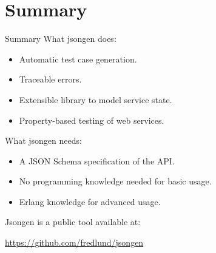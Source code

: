 \section{Summary}

\begin{frame}{Summary}
  What jsongen does:
  \begin{itemize}
  \item Automatic test case generation.
  \item Traceable errors.
  \item Extensible library to model service state.
  \item Property-based testing of web services.
  \end{itemize}

  \vspace{15pt}

  What jsongen needs:
  \begin{itemize}
  \item A JSON Schema specification of the API.
  \item No programming knowledge needed for basic usage.
  \item Erlang knowledge for advanced usage.
  \end{itemize}

  \vspace{15pt}
  Jsongen is a public tool available at:


  \begin{center}
    \url{https://github.com/fredlund/jsongen}
  \end{center}

\end{frame}